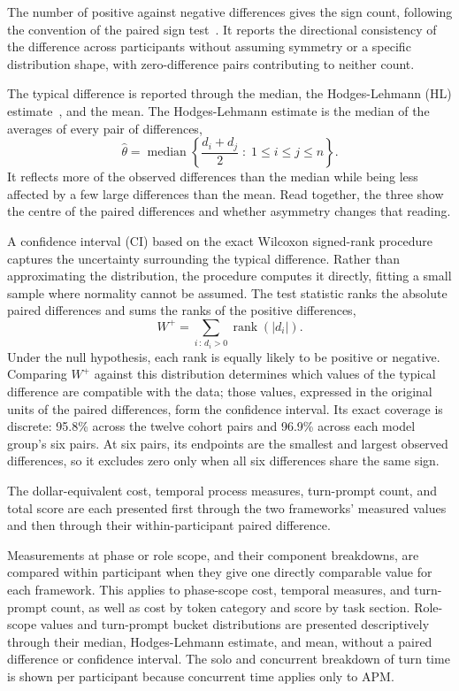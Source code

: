The number of positive against negative differences gives the sign count, following the convention of the paired sign test~\cite{corder2014nonparametric}. It reports the directional consistency of the difference across participants without assuming symmetry or a specific distribution shape, with zero-difference pairs contributing to neither count.

The typical difference is reported through the median, the Hodges-Lehmann (HL) estimate~\cite{hodges1963location}, and the mean. The Hodges-Lehmann estimate is the median of the averages of every pair of differences,
\[
    \hat{\theta} = \operatorname{median}\left\{ \frac{d_i + d_j}{2} \;:\; 1 \le i \le j \le n \right\}.
\]
It reflects more of the observed differences than the median while being less affected by a few large differences than the mean. Read together, the three show the centre of the paired differences and whether asymmetry changes that reading.

A confidence interval (CI) based on the exact Wilcoxon signed-rank procedure~\cite{wilcoxon1945signedrank, hollander2013nonparametric, corder2014nonparametric} captures the uncertainty surrounding the typical difference. Rather than approximating the distribution, the procedure computes it directly, fitting a small sample where normality cannot be assumed. The test statistic ranks the absolute paired differences and sums the ranks of the positive differences,
\[
    W^{+} = \sum_{i \,:\, d_i > 0} \operatorname{rank}\!\left( |d_i| \right).
\]
Under the null hypothesis, each rank is equally likely to be positive or negative. Comparing $W^+$ against this distribution determines which values of the typical difference are compatible with the data; those values, expressed in the original units of the paired differences, form the confidence interval. Its exact coverage is discrete: 95.8\% across the twelve cohort pairs and 96.9\% across each model group's six pairs. At six pairs, its endpoints are the smallest and largest observed differences, so it excludes zero only when all six differences share the same sign.

The dollar-equivalent cost, temporal process measures, turn-prompt count, and total score are each presented first through the two frameworks' measured values and then through their within-participant paired difference.

Measurements at phase or role scope, and their component breakdowns, are compared within participant when they give one directly comparable value for each framework. This applies to phase-scope cost, temporal measures, and turn-prompt count, as well as cost by token category and score by task section. Role-scope values and turn-prompt bucket distributions are presented descriptively through their median, Hodges-Lehmann estimate, and mean, without a paired difference or confidence interval. The solo and concurrent breakdown of turn time is shown per participant because concurrent time applies only to APM.

